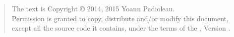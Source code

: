 \begin{quote}
The text is Copyright \copyright{} 2014, 2015 Yoann Padioleau.\\
Permission is granted to copy, distribute and/or modify this document,
except all the source code it contains, under the terms of the 
\license, Version \licenseversion.
\end{quote}
